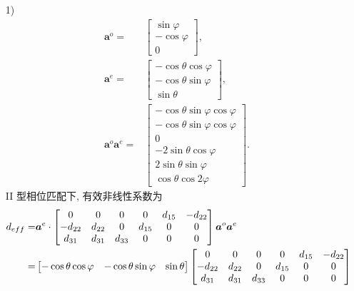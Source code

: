 \documentclass{assignment}
\begin{document}
\begin{sol}
    \begin{itemize}
        \item[1)] 
        \begin{align}
            \bm{a}^o=&\begin{bmatrix}
                \sin\varphi\\
                -\cos\varphi\\
                0
            \end{bmatrix},\\
            \bm{a}^e=&\begin{bmatrix}
                -\cos\theta\cos\varphi\\
                -\cos\theta\sin\varphi\\
                \sin\theta
            \end{bmatrix},\\
            \bm{a}^o\bm{a}^e=&\begin{bmatrix}
                -\cos\theta\sin\varphi\cos\varphi\\
                -\cos\theta\sin\varphi\cos\varphi\\
                0\\
                -2\sin\theta\cos\varphi\\
                2\sin\theta\sin\varphi\\
                \cos\theta\cos 2\varphi
            \end{bmatrix}.
        \end{align}
        II 型相位匹配下, 有效非线性系数为
        \begin{align}
            \notag d_{eff}=&\bm{a}^e\cdot\begin{bmatrix}
                0&0&0&0&d_{15}&-d_{22}\\
                -d_{22}&d_{22}&0&d_{15}&0&0\\
                d_{31}&d_{31}&d_{33}&0&0&0
            \end{bmatrix}\bm{a}^o\bm{a}^e\\
            \notag=&\begin{bmatrix}
                -\cos\theta\cos\varphi&-\cos\theta\sin\varphi&\sin\theta
            \end{bmatrix}\begin{bmatrix}
                0&0&0&0&d_{15}&-d_{22}\\
                -d_{22}&d_{22}&0&d_{15}&0&0\\
                d_{31}&d_{31}&d_{33}&0&0&0

\end{bmatrix}
\end{align}
\end{itemize}
\end{sol}
\end{document}
